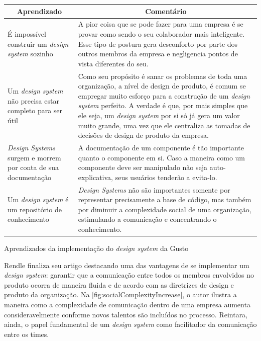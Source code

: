 \begin{quadro}
\centering
\begin{tabular}{|m{4cm}|m{10cm}|} \hline
	
	\multicolumn{1}{|c|}{\bfseries Aprendizado} & \multicolumn{1}{c|}{\bfseries Comentário} \\\hline
	
	 É impossível construir um \textit{design system} sozinho & A pior coisa que se pode fazer para uma empresa é se provar como sendo o seu colaborador mais inteligente. Esse tipo de postura gera desconforto por parte dos outros membros da empresa e negligencia pontos de vista diferentes do seu. \\\hline
	 
	 Um \textit{design system} não precisa estar completo para ser útil & Como seu propósito é sanar os problemas de toda uma organização, a nível de design de produto, é comum se empregar muito esforço para a construção de um \textit{design system} perfeito. A verdade é que, por mais simples que ele seja, um \textit{design system} por si só já gera um valor muito grande, uma vez que ele centraliza as tomadas de decisões de design de produto da empresa. \\\hline
	 
	 \textit{Design Systems} surgem e morrem por conta de sua documentação & A documentação de um componente é tão importante quanto o componente em si. Caso a maneira como um componente deve ser manipulado não seja auto-explicativa, seus usuários tenderão a evita-lo. \\\hline
	 
	 Um \textit{design system} é um repositório de conhecimento & \textit{Design Systems} não são importantes somente por representar precisamente a base de código, mas também por diminuir a complexidade social de uma organização, estimulando a comunicação e concentrando o conhecimento. \\\hline
    
\end{tabular}
\caption{Aprendizados da implementação do \textit{design system} da Gusto}
\label{table:gustoLessonsLearned}
\end{quadro}

Rendle finaliza seu artigo destacando uma das vantagens de se implementar um \textit{design system}: garantir que a comunicação entre todos os membros envolvidos no produto ocorra de maneira fluida e de acordo com as diretrizes de design e produto da organização. Na \autoref{fig:socialComplexityIncrease}, o autor ilustra a maneira como a complexidade de comunicação dentro de uma empresa aumenta consideravelmente conforme novos talentos são incluídos no processo. Reintara, ainda, o papel fundamental de um \textit{design system} como facilitador da comunicação entre os times.

